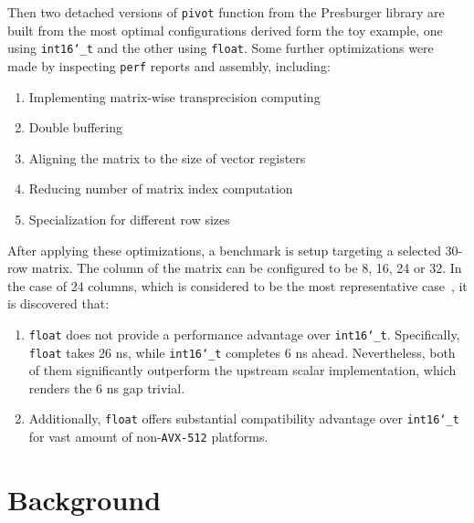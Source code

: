 \documentclass[logo,bsc,singlespacing,parskip]{infthesis}
\newcommand{\dtshort}{\texttt{int16\char`_t}}
\newcommand{\dtfloat}{\texttt{float}}
\newenvironment{compactlist}
{ \begin{enumerate}
    \setlength{\itemsep}{0pt}
    \setlength{\parskip}{0pt}
    \setlength{\parsep}{0pt}     
}
{ \end{enumerate} }
\begin{document}
Then two detached versions of \texttt{pivot} function from the Presburger
library are built from the most optimal configurations derived form the toy
example, one using \dtshort{} and the other using \dtfloat{}. Some
further optimizations were made by inspecting \texttt{perf} reports and
assembly, including: 

\begin{compactlist} 
    \item Implementing matrix-wise transprecision computing 
    \item Double buffering
    \item Aligning the matrix to the size of vector registers
    \item Reducing number of matrix index computation
    \item Specialization for different row sizes
\end{compactlist}

After applying these optimizations, a benchmark is setup targeting a selected
30-row matrix. The column of the matrix can be configured to be 8, 16, 24 or 32.
In the case of 24 columns, which is considered to be the most representative
case~\cite{FPL1}, it is discovered that: 
\begin{enumerate}
    \item \dtfloat{} does not provide a performance advantage over \dtshort{}.
    Specifically, \dtfloat{} takes 26 ns, while \dtshort{} completes 6 ns ahead.
    Nevertheless, both of them significantly outperform the upstream scalar
    implementation, which renders the 6 ns gap trivial. 
    \item Additionally, \dtfloat{} offers substantial compatibility advantage
    over \dtshort{} for vast amount of non-\texttt{AVX-512} platforms. 
\end{enumerate}



\chapter{Background}
\end{document}
